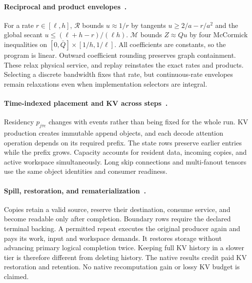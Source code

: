 \paragraph{Reciprocal and product envelopes~.}
For a rate $r\in[\ell,h]$, $\mathcal R$ bounds $u\approx1/r$ by tangents $u\ge2/a-r/a^2$ and the global secant $u\le(\ell+h-r)/(\ell h)$.
$\mathcal M$ bounds $Z\approx Qu$ by four McCormick inequalities on $[0,\bar Q]\times[1/h,1/\ell]$.
All coefficients are constants, so the program is linear.
Outward coefficient rounding preserves graph containment.
These relax physical service, and replay reinstates the exact rates and products.
Selecting a discrete bandwidth fixes that rate, but continuous-rate envelopes remain relaxations even when implementation selectors are integral.

\paragraph{Time-indexed placement and KV across steps~.}
Residency $p_{j\tau e}$ changes with events rather than being fixed for the whole run.
KV production creates immutable append objects, and each decode attention operation depends on its required prefix.
The state rows preserve earlier entries while the prefix grows.
Capacity accounts for resident data, incoming copies, and active workspace simultaneously.
Long skip connections and multi-fanout tensors use the same object identities and consumer readiness.

\paragraph{Spill, restoration, and rematerialization~.}
Copies retain a valid source, reserve their destination, consume service, and become readable only after completion.
Boundary rows require the declared terminal backing.
A permitted repeat executes the original producer again and pays its work, input and workspace demands.
It restores storage without advancing primary logical completion twice.
Keeping full KV history in a slower tier is therefore different from deleting history.
The native results credit paid KV restoration and retention.
No native recomputation gain or lossy KV budget is claimed.

